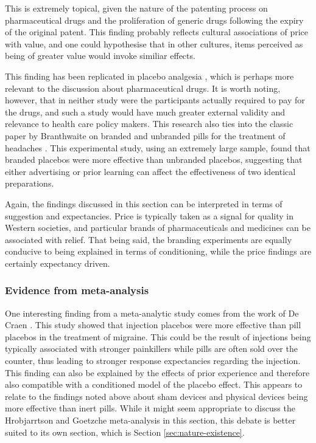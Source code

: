 This is extremely topical, given the nature of the patenting process on pharmaceutical drugs and the proliferation of generic drugs following the expiry of the original patent. This finding probably reflects cultural associations of price with value, and one could hypothesise that in other cultures, items perceived as being of greater value would invoke similiar effects.  

This finding has been replicated in placebo analgesia \cite{Waber2008}, which is perhaps more relevant to the discussion about pharmaceutical drugs. It is worth noting, however, that in neither study were the participants actually required to pay for the drugs, and such a study would have much greater external validity and relevance to health care policy makers. This research also ties into the classic paper by Branthwaite on branded and unbranded pills for the treatment of headaches \cite{Branthwaite1981}. This experimental study, using an extremely large sample, found that branded placebos were more effective than unbranded placebos, suggesting that either advertising or prior learning can affect the effectiveness of two identical preparations. 

Again, the findings discussed in this section can be interpreted in terms of suggestion and expectancies. Price is typically taken as a signal for quality in Western societies, and particular brands of pharmaceuticals and medicines can be associated with relief. That being said, the branding experiments are equally conducive to being explained in terms of conditioning, while the price findings are certainly expectancy driven. 

\subsubsection{Evidence from meta-analysis}
\label{sec:evidence-from-meta}

One interesting finding from a meta-analytic study comes from the work of De Craen \cite{Craen2000}. This study showed that injection placebos were more effective than pill placebos in the treatment of migraine. This could be the result of injections being typically associated with stronger painkillers while pills are often sold over the counter, thus leading to stronger response expectancies regarding the injection. This finding can also be explained by the effects of prior experience and therefore also compatible with a conditioned model of the placebo effect. This appears to relate to the findings noted above about sham devices and physical devices being more effective than inert pills.  While it might seem appropriate to discuss the Hrobjarrtson and Goetzche meta-analysis in this section, this debate is better suited to its own section, which is Section \ref{sec:nature-existence}.

